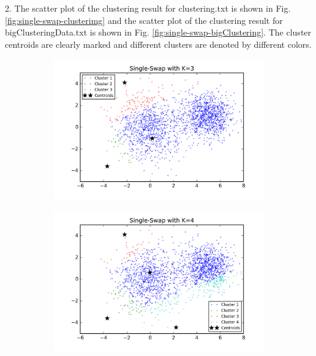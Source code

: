 \begin{description}
\begin{description}
\item{2.} The scatter plot of the clustering result for clustering.txt is shown in Fig. \ref{fig:single-swap-clusterimg} and the scatter plot of the clustering result for bigClusteringData.txt is shown in Fig. \ref{fig:single-swap-bigClustering}. The cluster centroids are clearly marked and different clusters are denoted by different colors. 

\begin{figure}[!h]
        \centering
        \begin{subfigure}[b]{0.475\textwidth}
            \centering
            \includegraphics[width=\textwidth]{./figures/clustering_singleSwap_3.png}
        \end{subfigure}
        \hfill
        \begin{subfigure}[b]{0.475\textwidth}  
            \centering 
            \includegraphics[width=\textwidth]{./figures/clustering_singleSwap_4.png}

\end{subfigure}
\end{figure}
\end{description}
\end{description}
